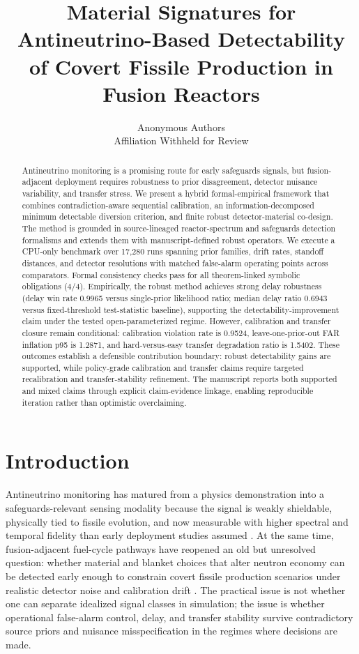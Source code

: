 \documentclass{article} %
\title{Material Signatures for Antineutrino-Based Detectability of Covert Fissile Production in Fusion Reactors}
\author{Anonymous Authors \\ Affiliation Withheld for Review}
\begin{document}
\maketitle

\begin{abstract}
Antineutrino monitoring is a promising route for early safeguards signals, but fusion-adjacent deployment requires robustness to prior disagreement, detector nuisance variability, and transfer stress. We present a hybrid formal-empirical framework that combines contradiction-aware sequential calibration, an information-decomposed minimum detectable diversion criterion, and finite robust detector-material co-design. The method is grounded in source-lineaged reactor-spectrum and safeguards detection formalisms and extends them with manuscript-defined robust operators. We execute a CPU-only benchmark over 17,280 runs spanning prior families, drift rates, standoff distances, and detector resolutions with matched false-alarm operating points across comparators. Formal consistency checks pass for all theorem-linked symbolic obligations (4/4). Empirically, the robust method achieves strong delay robustness (delay win rate 0.9965 versus single-prior likelihood ratio; median delay ratio 0.6943 versus fixed-threshold test-statistic baseline), supporting the detectability-improvement claim under the tested open-parameterized regime. However, calibration and transfer closure remain conditional: calibration violation rate is 0.9524, leave-one-prior-out FAR inflation p95 is 1.2871, and hard-versus-easy transfer degradation ratio is 1.5402. These outcomes establish a defensible contribution boundary: robust detectability gains are supported, while policy-grade calibration and transfer claims require targeted recalibration and transfer-stability refinement. The manuscript reports both supported and mixed claims through explicit claim-evidence linkage, enabling reproducible iteration rather than optimistic overclaiming.
\end{abstract}

\section{Introduction}\label{sec:introduction}
Antineutrino monitoring has matured from a physics demonstration into a safeguards-relevant sensing modality because the signal is weakly shieldable, physically tied to fissile evolution, and now measurable with higher spectral and temporal fidelity than early deployment studies assumed \citep{SRC035,SRC034,SRC023,SRC018,SRC009,SRC001}. At the same time, fusion-adjacent fuel-cycle pathways have reopened an old but unresolved question: whether material and blanket choices that alter neutron economy can be detected early enough to constrain covert fissile production scenarios under realistic detector noise and calibration drift \citep{SRC007,SRC010,SRC019,SRC025,SRC026,SRC028,SRC036}. The practical issue is not whether one can separate idealized signal classes in simulation; the issue is whether operational false-alarm control, delay, and transfer stability survive contradictory source priors and nuisance misspecification in the regimes where decisions are made.
\end{document}
